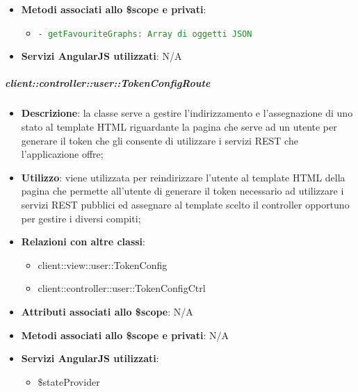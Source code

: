 \begin{itemize}
\begin{itemize}
					\end{itemize}

				\item \textbf{Metodi associati allo \$scope e privati}:
					\begin{itemize}
						\item \textcolor{forestgreen}{\texttt{- getFavouriteGraphs: Array di oggetti JSON}}


					\end{itemize}

				\item \textbf{Servizi AngularJS utilizzati}: N/A

			\end{itemize}

		\subparagraph{client::controller::user::TokenConfigRoute} %
		\label{subp:bdsm_app_client_controller_user_tokenconfigroute}

			\begin{itemize}
				\item \textbf{Descrizione}: la classe serve a gestire l'indirizzamento e l'assegnazione di uno stato al template HTML riguardante la pagina che serve ad un utente per generare il token che gli consente di utilizzare i servizi REST che l'applicazione offre;
				\item \textbf{Utilizzo}: viene utilizzata per reindirizzare l'utente al template HTML della pagina che permette all'utente di generare il token necessario ad utilizzare i servizi REST pubblici ed assegnare al template scelto il controller opportuno per gestire i diversi compiti;
				\item \textbf{Relazioni con altre classi}:
					\begin{itemize}
						\item client::view::user::TokenConfig
						\item client::controller::user::TokenConfigCtrl
					\end{itemize}
				\item \textbf{Attributi associati allo \$scope}: N/A
				\item \textbf{Metodi associati allo \$scope e privati}: N/A
				\item \textbf{Servizi AngularJS utilizzati}:
					\begin{itemize}
						\item \$stateProvider
					\end{itemize}
			\end{itemize}

